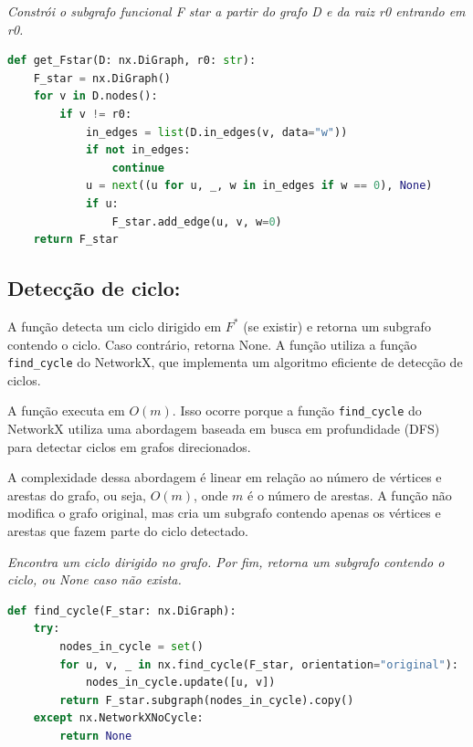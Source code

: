 \begin{tcolorbox}[
        enhanced, breakable,
        colframe=blue!60!black, colback=blue!2,
        colbacktitle=blue!15, coltitle=black,
        title={Construção de F star },
        boxed title style={sharp corners, boxrule=0.6pt},
        sharp corners, boxrule=0.6pt
    ]
    \emph{Constrói o subgrafo funcional F star a partir do grafo D e da raiz r0 entrando em r0.}
    \tcblower
    \begin{lstlisting}[mathescape=true, language=Python]
def get_Fstar(D: nx.DiGraph, r0: str):
    F_star = nx.DiGraph()
    for v in D.nodes():
        if v != r0:
            in_edges = list(D.in_edges(v, data="w"))
            if not in_edges:
                continue
            u = next((u for u, _, w in in_edges if w == 0), None)
            if u:
                F_star.add_edge(u, v, w=0)
    return F_star
\end{lstlisting}
\end{tcolorbox}

\subsection{Detecção de ciclo:}
A função detecta um ciclo dirigido em \(F^*\) (se existir) e retorna um subgrafo contendo o ciclo. Caso contrário, retorna None. A função utiliza a função \texttt{find\_cycle} do NetworkX, que implementa um algoritmo eficiente de detecção de ciclos.

A função executa em \(O(m)\). Isso ocorre porque a função \texttt{find\_cycle} do NetworkX utiliza uma abordagem baseada em busca em profundidade (DFS) para detectar ciclos em grafos direcionados.

A complexidade dessa abordagem é linear em relação ao número de vértices e arestas do grafo, ou seja, \(O(m)\), onde \(m\) é o número de arestas. A função não modifica o grafo original, mas cria um subgrafo contendo apenas os vértices e arestas que fazem parte do ciclo detectado.

\begin{tcolorbox}[
        enhanced, breakable,
        colframe=blue!60!black, colback=blue!2,
        colbacktitle=blue!15, coltitle=black,
        title={Detecção de ciclo dirigido em $F^*$},
        boxed title style={sharp corners, boxrule=0.6pt},
        sharp corners, boxrule=0.6pt
    ]
    \emph{Encontra um ciclo dirigido no grafo. Por fim, retorna um subgrafo contendo o ciclo, ou None caso não exista.}
    \tcblower
    \begin{lstlisting}[mathescape=true, language=Python]
def find_cycle(F_star: nx.DiGraph):
    try:
        nodes_in_cycle = set()
        for u, v, _ in nx.find_cycle(F_star, orientation="original"):
            nodes_in_cycle.update([u, v])
        return F_star.subgraph(nodes_in_cycle).copy()
    except nx.NetworkXNoCycle:
        return None  
\end{lstlisting}
\end{tcolorbox}


